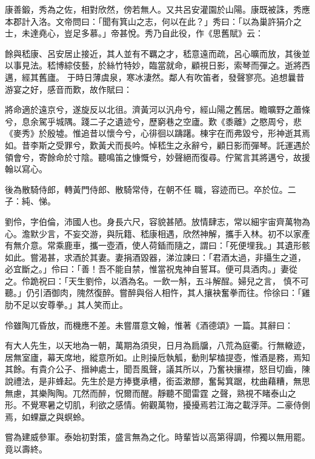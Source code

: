 \begin{pinyinscope}
 康善鍛，秀為之佐，相對欣然，傍若無人。又共呂安灌園於山陽。康既被誅，秀應本郡計入洛。文帝問曰：「聞有箕山之志，何以在此？」秀曰：「以為巢許狷介之士，未達堯心，豈足多慕。」帝甚悅。秀乃自此役，作《思舊賦》云：



 餘與嵇康、呂安居止接近，其人並有不羈之才，嵇意遠而疏，呂心曠而放，其後並以事見法。嵇博綜伎藝，於絲竹特妙，臨當就命，顧視日影，索琴而彈之。逝將西邁，經其舊廬。
 于時日薄虞泉，寒冰淒然。鄰人有吹笛者，發聲寥亮。追想曩昔游宴之好，感音而歎，故作賦曰：



 將命適於遠京兮，遂旋反以北徂。濟黃河以汎舟兮，經山陽之舊居。瞻曠野之蕭條兮，息余駕乎城隅。踐二子之遺迹兮，歷窮巷之空廬。歎《黍離》之愍周兮，悲《麥秀》於殷墟。惟追昔以懷今兮，心徘徊以躊躇。棟宇在而弗毀兮，形神逝其焉如。昔李斯之受罪兮，歎黃犬而長吟。悼嵇生之永辭兮，顧日影而彈琴。託運遇於領會兮，寄餘命於寸陰。聽鳴笛之慷慨兮，妙聲絕而復尋。佇駕言其將邁兮，故援翰以寫心。



 後為散騎侍郎，轉黃門侍郎、散騎常侍，在朝不任
 職，容迹而已。卒於位。二子：純、悌。



 劉伶，字伯倫，沛國人也。身長六尺，容貌甚陋。放情肆志，常以細宇宙齊萬物為心。澹默少言，不妄交游，與阮籍、嵇康相遇，欣然神解，攜手入林。初不以家產有無介意。常乘鹿車，攜一壺酒，使人荷鍤而隨之，謂曰：「死便埋我。」其遺形骸如此。嘗渴甚，求酒於其妻。妻捐酒毀器，涕泣諫曰：「君酒太過，非攝生之道，必宜斷之。」伶曰：「善！吾不能自禁，惟當祝鬼神自誓耳。便可具酒肉。」妻從之。伶跪祝曰：「天生劉伶，以酒為名。一飲一斛，五斗解酲。婦兒之言，
 慎不可聽。」仍引酒御肉，隗然復醉。嘗醉與俗人相忤，其人攘袂奮拳而往。伶徐曰：「雞肋不足以安尊拳。」其人笑而止。



 伶雖陶兀昏放，而機應不差。未嘗厝意文翰，惟著《酒德頌》一篇。其辭曰：



 有大人先生，以天地為一朝，萬期為須臾，日月為扃牖，八荒為庭衢。行無轍迹，居無室廬，幕天席地，縱意所如。止則操卮執觚，動則挈榼提壺，惟酒是務，焉知其餘。有貴介公子、搢紳處士，聞吾風聲，議其所以，乃奮袂攘襟，怒目切齒，陳說禮法，是非蜂起。先生於是方捧甕承槽，銜盃漱醪，奮髯箕踞，枕曲藉糟，無思無慮，其樂陶陶。兀然而醉，怳爾而醒。靜聽不聞雷霆
 之聲，熟視不睹泰山之形。不覺寒暑之切肌，利欲之感情。俯觀萬物，擾擾焉若江海之載浮萍。二豪侍側焉，如蜾蠃之與螟蛉。



 嘗為建威參軍。泰始初對策，盛言無為之化。時輩皆以高第得調，伶獨以無用罷。竟以壽終。




\end{pinyinscope}
